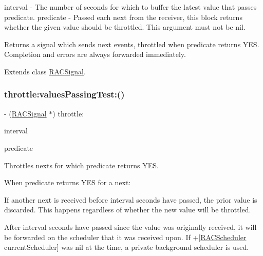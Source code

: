 interval -\/ The number of seconds for which to buffer the latest value that passes {\ttfamily predicate}. predicate -\/ Passed each {\ttfamily next} from the receiver, this block returns whether the given value should be throttled. This argument must not be nil.

Returns a signal which sends {\ttfamily next} events, throttled when {\ttfamily predicate} returns Y\+ES. Completion and errors are always forwarded immediately. 

Extends class \mbox{\hyperlink{interface_r_a_c_signal_a0310fbee83b4ca1b1daca25daf24f41b}{R\+A\+C\+Signal}}.

\mbox{\label{category_r_a_c_signal_07_operations_08_a0310fbee83b4ca1b1daca25daf24f41b}} 
\subsubsection{\texorpdfstring{throttle\+:values\+Passing\+Test\+:()}{throttle:valuesPassingTest:()}\hspace{0.1cm}{\footnotesize\ttfamily [2/3]}}
{\footnotesize\ttfamily -\/ (\mbox{\hyperlink{interface_r_a_c_signal}{R\+A\+C\+Signal}} $\ast$) throttle\+: \begin{DoxyParamCaption}\item[{(N\+S\+Time\+Interval)}]{interval }\item[{valuesPassingTest:(B\+O\+OL($^\wedge$)(id next))}]{predicate }\end{DoxyParamCaption}}

Throttles {\ttfamily next}s for which {\ttfamily predicate} returns Y\+ES.

When {\ttfamily predicate} returns Y\+ES for a {\ttfamily next}\+:


\begin{DoxyEnumerate}
\item If another {\ttfamily next} is received before {\ttfamily interval} seconds have passed, the prior value is discarded. This happens regardless of whether the new value will be throttled.
\item After {\ttfamily interval} seconds have passed since the value was originally received, it will be forwarded on the scheduler that it was received upon. If +\mbox{[}\mbox{\hyperlink{interface_r_a_c_scheduler}{R\+A\+C\+Scheduler}} current\+Scheduler\mbox{]} was nil at the time, a private background scheduler is used.
\end{DoxyEnumerate}

